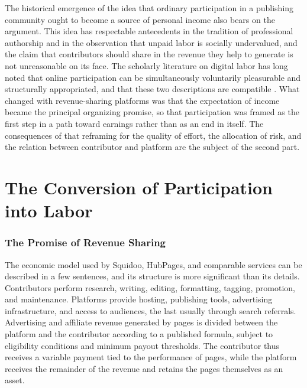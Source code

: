 \documentclass[11pt]{article}
\theoremstyle{remark}
\begin{document}
The historical emergence of the idea that ordinary participation in a publishing community ought to become a source of personal income also bears on the argument. This idea has respectable antecedents in the tradition of professional authorship and in the observation that unpaid labor is socially undervalued, and the claim that contributors should share in the revenue they help to generate is not unreasonable on its face. The scholarly literature on digital labor has long noted that online participation can be simultaneously voluntarily pleasurable and structurally appropriated, and that these two descriptions are compatible \cite{terranova2000}. What changed with revenue-sharing platforms was that the expectation of income became the principal organizing promise, so that participation was framed as the first step in a path toward earnings rather than as an end in itself. The consequences of that reframing for the quality of effort, the allocation of risk, and the relation between contributor and platform are the subject of the second part.

\part{The Conversion of Participation into Labor}

\section{The Promise of Revenue Sharing}

The economic model used by Squidoo, HubPages, and comparable services can be described in a few sentences, and its structure is more significant than its details. Contributors perform research, writing, editing, formatting, tagging, promotion, and maintenance. Platforms provide hosting, publishing tools, advertising infrastructure, and access to audiences, the last usually through search referrals. Advertising and affiliate revenue generated by pages is divided between the platform and the contributor according to a published formula, subject to eligibility conditions and minimum payout thresholds. The contributor thus receives a variable payment tied to the performance of pages, while the platform receives the remainder of the revenue and retains the pages themselves as an asset.
\end{document}
